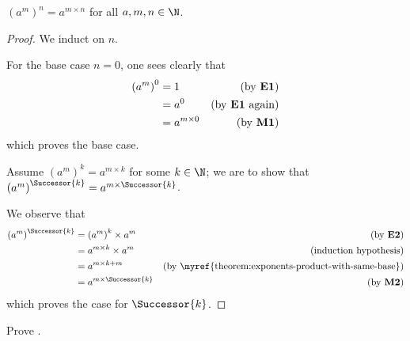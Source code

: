 \begin{theorem}\label{theorem:exponents-power-raised-to-a-power}
    $\left(a^m\right)^n = a^{m\times n}$ for all $a, m, n \in \N$.
\end{theorem}
\begin{proof}
    We induct on $n$.

    For the base case $n = 0$, one sees clearly that
    \begin{align*}
        \left(a^m\right)^0 &= 1 & (\text{by \textbf{E1}})\\
        &= a^0 & (\text{by \textbf{E1} again})\\
        &= a^{m\times 0} & (\text{by \textbf{M1}})
    \end{align*}
    which proves the base case.

    Assume $\left(a^m\right)^k = a^{m\times k}$ for some $k \in \N$; we are to show that $\left(a^m\right)^\Successor{k} = a^{m\times \Successor{k}}$.

    We observe that
    \begin{align*}
        \left(a^m\right)^\Successor{k} &= \left(a^m\right)^k \times a^m & (\text{by \textbf{E2}})\\
        &= a^{m\times k} \times a^m & (\text{induction hypothesis})\\
        &= a^{m\times k + m} & (\text{by \myref{theorem:exponents-product-with-same-base}})\\
        &= a^{m \times \Successor{k}} & (\text{by \textbf{M2}})
    \end{align*}
    which proves the case for $\Successor{k}$.
\end{proof}

\begin{exercise}\label{exercise:exponents-product-to-a-power}
    Prove .
\end{exercise}
